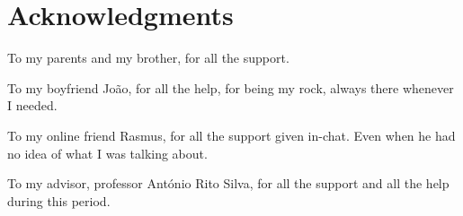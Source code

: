 
\chapter*{Acknowledgments}

To my parents and my brother, for all the support. 

To my boyfriend Jo\~{a}o, for all the help, for being my rock, always there whenever I needed.

To my online friend Rasmus, for all the support given in-chat. Even when he had no idea of what I was talking about.

To my advisor, professor Ant\'{o}nio Rito Silva, for all the support and all the help during this period.

